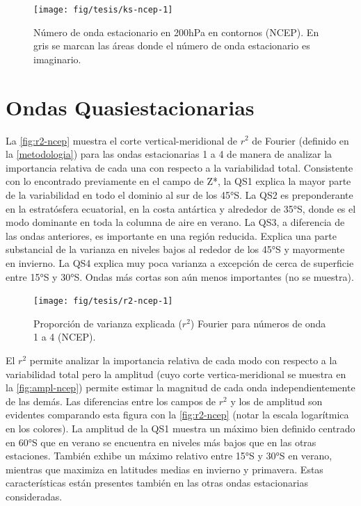 \documentclass[spanish,a4paper,12pt,oneside]{book}
\begin{document}
\begin{landscape}\begin{figure}

{\centering \texttt{[image: fig/tesis/ks-ncep-1]} 

}

\caption{Número de onda estacionario en 200hPa en contornos (NCEP). En gris se marcan las áreas donde el número de onda estacionario es imaginario.}\label{fig:ks-ncep}
\end{figure}
\end{landscape}

\hypertarget{ondas-quasiestacionarias}{%
\section{Ondas Quasiestacionarias}\label{ondas-quasiestacionarias}}

La \autoref{fig:r2-ncep} muestra el corte vertical-meridional de \(r^2\)
de Fourier (definido en la \autoref{metodologia}) para las ondas
estacionarias 1 a 4 de manera de analizar la importancia relativa de
cada una con respecto a la variabilidad total. Consistente con lo
encontrado previamente en el campo de Z*, la QS1 explica la mayor parte
de la variabilidad en todo el dominio al sur de los 45°S. La QS2 es
preponderante en la estratósfera ecuatorial, en la costa antártica y
alrededor de 35°S, donde es el modo dominante en toda la columna de aire
en verano. La QS3, a diferencia de las ondas anteriores, es importante
en una región reducida. Explica una parte substancial de la varianza en
niveles bajos al rededor de los 45°S y mayormente en invierno. La QS4
explica muy poca varianza a excepción de cerca de superficie entre 15°S
y 30°S. Ondas más cortas son aún menos importantes (no se muestra).

\begin{landscape}\begin{figure}

{\centering \texttt{[image: fig/tesis/r2-ncep-1]} 

}

\caption{Proporción de varianza explicada ($r^2$)  Fourier para números de onda 1 a 4 (NCEP). }\label{fig:r2-ncep}
\end{figure}
\end{landscape}

El \(r^2\) permite analizar la importancia relativa de cada modo con
respecto a la variabilidad total pero la amplitud (cuyo corte
vertica-meridional se muestra en la \autoref{fig:ampl-ncep}) permite
estimar la magnitud de cada onda independientemente de las demás. Las
diferencias entre los campos de \(r^2\) y los de amplitud son evidentes
comparando esta figura con la \autoref{fig:r2-ncep} (notar la escala
logarítmica en los colores). La amplitud de la QS1 muestra un máximo
bien definido centrado en 60°S que en verano se encuentra en niveles más
bajos que en las otras estaciones. También exhibe un máximo relativo
entre 15°S y 30°S en verano, mientras que maximiza en latitudes medias
en invierno y primavera. Estas características están presentes también
en las otras ondas estacionarias consideradas.
\end{document}
